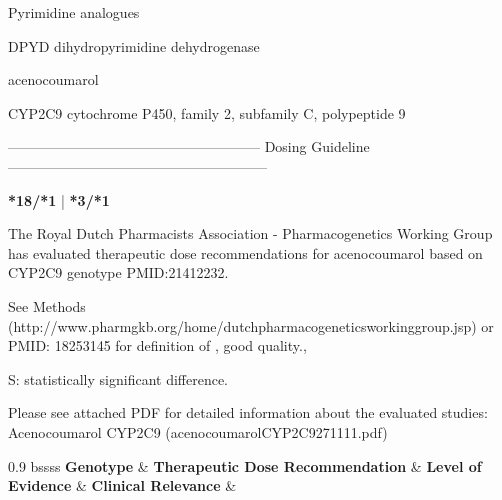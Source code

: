 \documentclass{resume} %
\begin{document}
\begin{rSection}{ Pyrimidine analogues }
\item[]
\begin{rSubsection}{ DPYD }{ dihydropyrimidine dehydrogenase }{}{}
\item[]


\end{rSubsection}

\end{rSection}
\begin{rSection}{ acenocoumarol }
\item[]
\begin{rSubsection}{ CYP2C9 }{ cytochrome P450, family 2, subfamily C, polypeptide 9 }{}{}
\item[]
\item[] ------------------------------------------------------ Dosing Guideline --------------------------------------------------------\newline
\item[]
\item[] \textbf{ *18/*1 } | \textbf{ *3/*1 }
\item The Royal Dutch Pharmacists Association - Pharmacogenetics Working Group has evaluated therapeutic dose recommendations for acenocoumarol based on CYP2C9 genotype PMID:21412232.
 \newline
\item *See Methods (http://www.pharmgkb.org/home/dutchpharmacogeneticsworkinggroup.jsp) or PMID: 18253145 for definition of , good quality., 
 \newline
\item S: statistically significant difference.
 \newline
\item Please see attached PDF for detailed information about the evaluated studies: Acenocoumarol CYP2C9 (acenocoumarolCYP2C9271111.pdf) \newline
\vspace{1pt}\newline
		\scriptsize
		\begin{center}
		\begin{tabularx}{0.9\textwidth}{ bssss }
		\textbf{ Genotype }&\textbf{ Therapeutic Dose Recommendation }&\textbf{ Level of Evidence }&\textbf{ Clinical Relevance }&\textbf{
}\\
		\vspace{1pt}\\
		\hline \\
		\vspace{1pt}\\

\end{tabularx}
\end{center}
\end{rSubsection}
\end{rSection}
\end{document}
